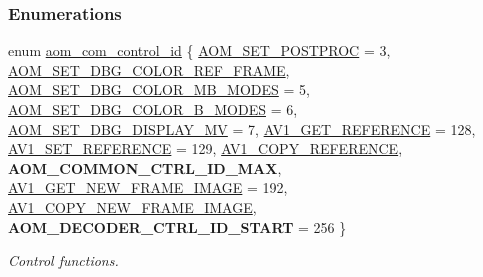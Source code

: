 \subsubsection*{Enumerations}
\begin{DoxyCompactItemize}
\item 
enum \hyperlink{group__aom_ga9421a1fa78c0d9587ae5aa6c1cb3d659}{aom\+\_\+com\+\_\+control\+\_\+id} \{ \newline
\hyperlink{group__aom_gga9421a1fa78c0d9587ae5aa6c1cb3d659a38a077f5bce4e82d137ec1825b926b47}{A\+O\+M\+\_\+\+S\+E\+T\+\_\+\+P\+O\+S\+T\+P\+R\+OC} = 3, 
\hyperlink{group__aom_gga9421a1fa78c0d9587ae5aa6c1cb3d659a92b2ba27f46b7c3c2e2ad7aabf65750a}{A\+O\+M\+\_\+\+S\+E\+T\+\_\+\+D\+B\+G\+\_\+\+C\+O\+L\+O\+R\+\_\+\+R\+E\+F\+\_\+\+F\+R\+A\+ME}, 
\hyperlink{group__aom_gga9421a1fa78c0d9587ae5aa6c1cb3d659af103c902305c536a783f27b2afe7347d}{A\+O\+M\+\_\+\+S\+E\+T\+\_\+\+D\+B\+G\+\_\+\+C\+O\+L\+O\+R\+\_\+\+M\+B\+\_\+\+M\+O\+D\+ES} = 5, 
\hyperlink{group__aom_gga9421a1fa78c0d9587ae5aa6c1cb3d659a95f41ff924fa77edb66ea2c1ed780942}{A\+O\+M\+\_\+\+S\+E\+T\+\_\+\+D\+B\+G\+\_\+\+C\+O\+L\+O\+R\+\_\+\+B\+\_\+\+M\+O\+D\+ES} = 6, 
\newline
\hyperlink{group__aom_gga9421a1fa78c0d9587ae5aa6c1cb3d659af7eb68ae889b8ba8eca2b3c2a7db0a47}{A\+O\+M\+\_\+\+S\+E\+T\+\_\+\+D\+B\+G\+\_\+\+D\+I\+S\+P\+L\+A\+Y\+\_\+\+MV} = 7, 
\hyperlink{group__aom_gga9421a1fa78c0d9587ae5aa6c1cb3d659a4b8bcdaae4f4ff2e78d2e9d53090e13b}{A\+V1\+\_\+\+G\+E\+T\+\_\+\+R\+E\+F\+E\+R\+E\+N\+CE} = 128, 
\hyperlink{group__aom_gga9421a1fa78c0d9587ae5aa6c1cb3d659a51ad4467b4dc318406cceb257e2daa41}{A\+V1\+\_\+\+S\+E\+T\+\_\+\+R\+E\+F\+E\+R\+E\+N\+CE} = 129, 
\hyperlink{group__aom_gga9421a1fa78c0d9587ae5aa6c1cb3d659af5c56c3dbccf31fca7621e8327ba7354}{A\+V1\+\_\+\+C\+O\+P\+Y\+\_\+\+R\+E\+F\+E\+R\+E\+N\+CE}, 
\newline
{\bfseries A\+O\+M\+\_\+\+C\+O\+M\+M\+O\+N\+\_\+\+C\+T\+R\+L\+\_\+\+I\+D\+\_\+\+M\+AX}, 
\hyperlink{group__aom_gga9421a1fa78c0d9587ae5aa6c1cb3d659a410c706a34f5295996658cc5044a700f}{A\+V1\+\_\+\+G\+E\+T\+\_\+\+N\+E\+W\+\_\+\+F\+R\+A\+M\+E\+\_\+\+I\+M\+A\+GE} = 192, 
\hyperlink{group__aom_gga9421a1fa78c0d9587ae5aa6c1cb3d659ae41763622ee33cd99e23ca8f78a3f8fa}{A\+V1\+\_\+\+C\+O\+P\+Y\+\_\+\+N\+E\+W\+\_\+\+F\+R\+A\+M\+E\+\_\+\+I\+M\+A\+GE}, 
{\bfseries A\+O\+M\+\_\+\+D\+E\+C\+O\+D\+E\+R\+\_\+\+C\+T\+R\+L\+\_\+\+I\+D\+\_\+\+S\+T\+A\+RT} = 256
 \}\begin{DoxyCompactList}\small\item\em Control functions. \end{DoxyCompactList}

\end{DoxyCompactItemize}
